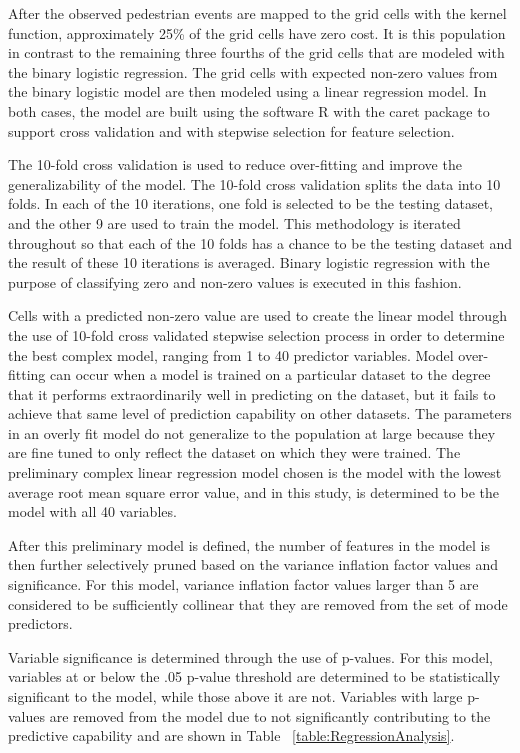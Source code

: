 \documentclass{llncs}
\begin{document}
After the observed pedestrian events are mapped to the grid cells with the kernel function,  approximately 25\% of the grid cells have zero cost.  It is this population in contrast to the remaining three fourths of the grid cells that are modeled with the binary logistic regression. The grid cells with expected non-zero values from the binary logistic model are then modeled using a linear regression model. In both cases, the model are built using the software R with the caret package to support cross validation and with stepwise selection for feature selection.

The 10-fold cross validation is used to reduce over-fitting and improve the generalizability of the model. The 10-fold cross validation splits the data into 10 folds. In each of the 10 iterations, one fold is selected to be the testing dataset, and the other 9 are used to train the model. This methodology is iterated throughout so that each of the 10 folds has a chance to be the testing dataset and the result of these 10 iterations is averaged. Binary logistic regression with the purpose of classifying zero and non-zero values is executed in this fashion.

Cells with a predicted non-zero value are used to create the linear model through the use of 10-fold cross validated stepwise selection process in order to determine the best complex model, ranging from 1 to 40 predictor variables.  Model over-fitting can occur when a model is trained on a particular dataset to the degree that it performs extraordinarily well in predicting on the dataset, but it fails to achieve that same level of prediction capability on other datasets. The parameters in an overly fit model do not generalize to the population at large because they are fine tuned to only reflect the dataset on which they were trained. The preliminary complex linear regression model chosen is the model with the lowest average root mean square error value, and in this study, is determined to be the model with all 40 variables.

After this preliminary model is defined,  the number of features in the model is then further  selectively pruned based on the variance inflation factor values and significance. For this model, variance inflation factor values larger than 5 are considered to be sufficiently collinear that they are removed from the set of mode predictors.


Variable significance is determined through the use of p-values. For this model, variables at or below the .05 p-value threshold are determined to be statistically significant to the model, while those above it are not. Variables with large p-values are removed from the model due to not significantly contributing to the predictive capability and are shown in Table ~\ref{table:RegressionAnalysis}. 
\end{document}
